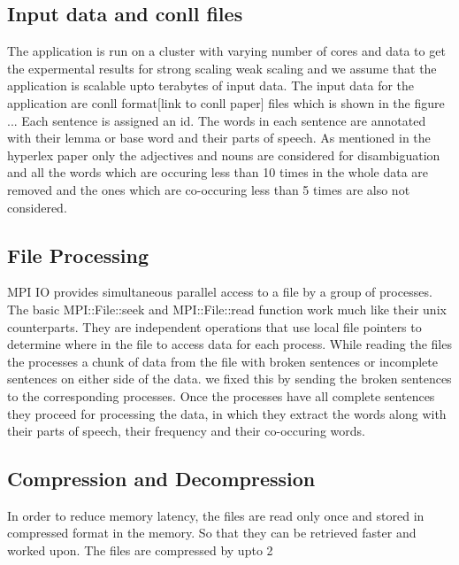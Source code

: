 \documentclass[article,dr=phil,type=drfinal,colorback,accentcolor=tud9c]{tudthesis}
\begin{document}
\subsection{Input data and conll files}
The application is run on a cluster with varying number of cores and data to get the expermental results for strong scaling weak scaling and we assume that the application is scalable upto terabytes of input data. The input data for the application are conll format[link to conll paper] files which is shown in the figure ... Each sentence is assigned an id. The words in each sentence are annotated with their lemma or base word and their parts of speech.  As mentioned in the hyperlex paper only the adjectives and nouns are considered for disambiguation and all the words which are occuring less than 10 times in the whole data are removed and the ones which are co-occuring less than 5 times are also not considered.

\newpage
\subsection{File Processing}
MPI IO provides simultaneous parallel access to a file by a group of processes.  The basic MPI::File::seek and MPI::File::read function work much like their unix counterparts. They are independent operations that use local file pointers to determine where in the file to access data for each process. While reading the files the processes a chunk of data from the file with broken sentences or incomplete sentences on either side of the data. we fixed this by sending the broken sentences to the corresponding processes. Once the processes have all complete sentences they proceed for processing the data, in which they extract the words along with their parts of speech, their frequency and their co-occuring words.

\newpage
\subsection{Compression and Decompression}
In order to reduce memory latency, the files are read only once and stored in compressed format in the memory. So that they can be retrieved faster and worked upon. The files are compressed by upto 2%

\newpage
\end{document}
